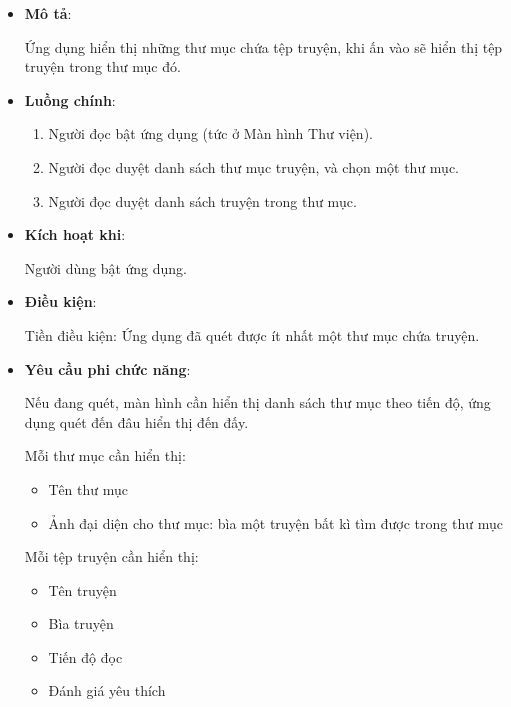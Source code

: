 \documentclass[../../thesis]{subfiles}
\begin{document}
\begin{itemize}
    \item
        \textbf{Mô tả}:

        Ứng dụng hiển thị những thư mục chứa tệp truyện, khi ấn vào sẽ hiển thị
        tệp truyện trong thư mục đó.
    \item
        \textbf{Luồng chính}:

        \begin{enumerate}
            \item
                Người đọc bật ứng dụng (tức ở Màn hình Thư viện).
            \item
                Người đọc duyệt danh sách thư mục truyện, và chọn một thư mục.
            \item
                Người đọc duyệt danh sách truyện trong thư mục.
        \end{enumerate}
    \item
        \textbf{Kích hoạt khi}:

        Người dùng bật ứng dụng.
    \item
        \textbf{Điều kiện}:

        Tiền điều kiện: Ứng dụng đã quét được ít nhất một thư mục chứa truyện.
    \item
        \textbf{Yêu cầu phi chức năng}:

        Nếu đang quét, màn hình cần hiển thị danh sách thư mục theo tiến độ, ứng
        dụng quét đến đâu hiển thị đến đấy.

        Mỗi thư mục cần hiển thị:

        \begin{itemize}
            \item
                Tên thư mục
            \item
                Ảnh đại diện cho thư mục: bìa một truyện bất kì tìm được trong
                thư mục
        \end{itemize}

        Mỗi tệp truyện cần hiển thị:

        \begin{itemize}
            \item
                Tên truyện
            \item
                Bìa truyện
            \item
                Tiến độ đọc
            \item
                Đánh giá yêu thích
        \end{itemize}
\end{itemize}
\end{document}
